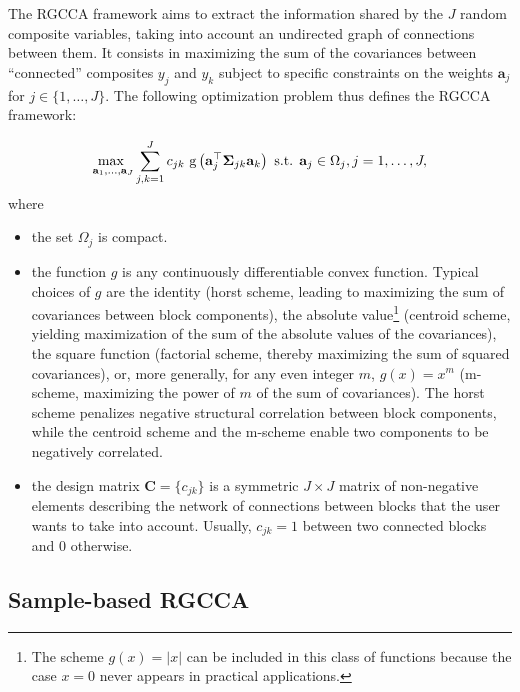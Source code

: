 \documentclass[
]{jss}
\begin{document}
The RGCCA framework aims to extract the information shared by the \(J\)
random composite variables, taking into account an undirected graph of
connections between them. It consists in maximizing the sum of the
covariances between ``connected'' composites \(y_j\) and \(y_k\) subject
to specific constraints on the weights \(\mathbf a_j\) for
\(j \in \{1, \ldots, J\}\). The following optimization problem thus
defines the RGCCA framework:

\begin{equation}
\underset{\mathbf{a}_1, \ldots,\mathbf{a}_J}{\text{max }}  \displaystyle  \sum_{j, k = 1}^J c_{jk} \text{
g}\left(\mathbf{a}_j^\top  \mathbf \Sigma_{jk} \mathbf{a}_k\right)\\
\text{ s.t. } \mathbf{a}_j \in \Omega_j, j =1, \ldots, J,
\label{optim_RGCCA}
\end{equation} where

\begin{itemize}
\item the set $\Omega_j$ is compact.

\item the function $g$ is any continuously differentiable convex function. Typical choices of $g$ are the identity (horst scheme, leading to maximizing the sum of covariances between block components), the absolute value\footnote{The scheme $g(x) = \vert x \vert$ can be included in this class of functions because the case $x=0$ never appears in practical applications.} (centroid scheme, yielding maximization of the sum of the absolute values of the covariances), the square function (factorial scheme, thereby maximizing the sum of squared covariances), or, more generally, for any even integer $m$, $g(x) = x^m$ (m-scheme, maximizing the power of $m$ of the sum of covariances). The horst scheme penalizes negative structural correlation between block components, while the centroid scheme and the m-scheme enable two components to be negatively correlated. 

\item the design matrix $\mathbf C = \lbrace c_{jk}\rbrace$ is a symmetric $J \times J$ matrix of non-negative elements describing the network of connections between blocks that the user wants to take into account. Usually, $c_{jk} = 1$ between two connected blocks and $0$ otherwise. 
\end{itemize}

\hypertarget{sample-based-rgcca}{%
\subsection{Sample-based RGCCA}\label{sample-based-rgcca}}
\end{document}

